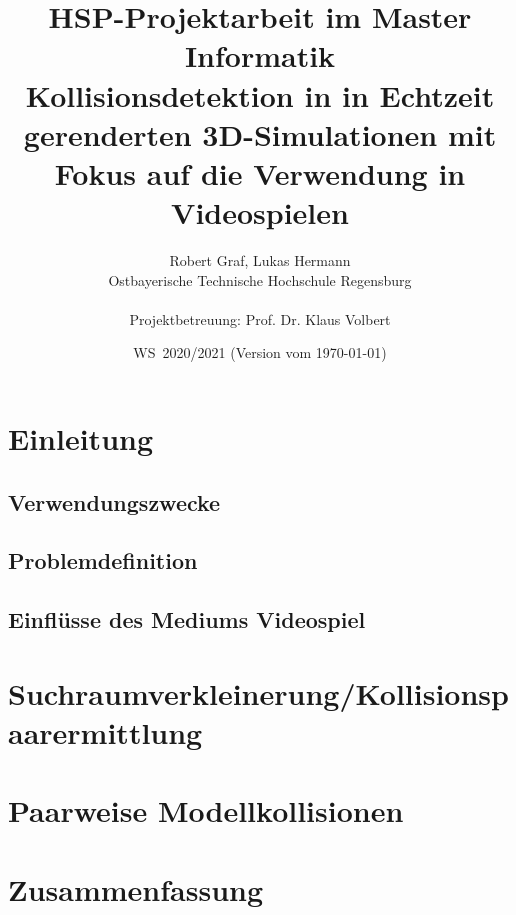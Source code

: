 \documentclass[11pt,twoside,a4paper]{article}
\begin{document}
\title{HSP-Projektarbeit im Master Informatik \\
\small Kollisionsdetektion in in Echtzeit gerenderten 3D-Simulationen mit Fokus auf die Verwendung in Videospielen}
\author{Robert Graf, Lukas Hermann\\

  Ostbayerische Technische Hochschule Regensburg\\
  \\
  Projektbetreuung: Prof. Dr. Klaus Volbert
}
  
\date{WS\, 2020/2021 (Version vom \today)}


\maketitle

\newpage
\tableofcontents
\newpage



\section{Einleitung}


\subsection{Verwendungszwecke}


\subsection{Problemdefinition}


\subsection{Einflüsse des Mediums Videospiel}



\section{Suchraumverkleinerung/Kollisionspaarermittlung}

\section{Paarweise Modellkollisionen}


\section{Zusammenfassung}


\newpage
\printbibliography

\newpage
\appendix

\end{document}
